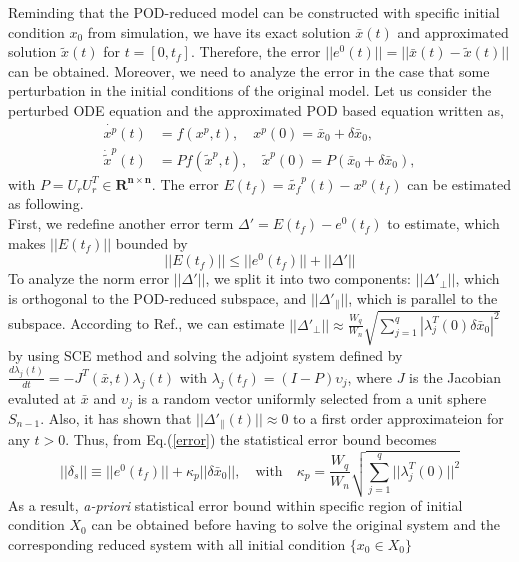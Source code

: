 \documentclass[runningheads,a4paper]{llncs}
\theoremstyle{definition}
\theoremstyle{plain}
\begin{document}
Reminding that the POD-reduced model can be constructed with specific initial condition $x_0$ from simulation, we have its exact solution $\bar{x}(t)$ and approximated solution $\tilde{x}(t)$ for $t=[0,t_f]$. Therefore, the error $||e^0(t)||=||\bar{x}(t)-\tilde{x}(t)||$ can be obtained. Moreover, we need to analyze the error in the case that some perturbation in the initial conditions of the original model. Let us consider the perturbed ODE equation and the approximated POD based equation written as,
\begin{align}
\dot{x^p}(t)&=f(x^p,t), \quad x^p(0)=\bar{x}_0 +\delta \bar{x}_0,\\
\dot{\tilde{x}}^p(t)&=P f(\tilde{x}^p,t), \quad \tilde{x}^p(0)=P (\bar{x}_0 +\delta \bar{x}_0),
\end{align}
with $P=U_r U_r^T \in \mathbf{R^{n \times n}}$. The error $E(t_f)=\tilde{x_f}^p(t)-x^p(t_f)$ can be estimated as following.\\
First, we redefine another error term $\Delta'=E(t_f)-e^0(t_f)$ to estimate, which makes $||E(t_f)||$ bounded by 
\begin{equation}
||E(t_f)||\leq ||e^0(t_f)||+||\Delta'|| \label{error}
\end{equation} 
To analyze the norm error $||\Delta'||$, we split it into two components: $||\Delta'_\perp||$, which is orthogonal to the POD-reduced subspace, and $||\Delta'_\parallel||$, which is parallel to the subspace.
According to Ref.\cite{Homescu05errorestimation}, we can estimate $||\Delta'_\perp||\approx \frac{W_q}{W_n}\sqrt{\sum_{j=1}^q |\lambda_j^T (0)\delta \bar{x}_0|^2}$ by using SCE method and solving the adjoint system defined by $\frac{d\lambda_j(t)}{dt}=-J^T(\bar{x},t)\lambda_j(t)$ with $\lambda_j(t_f)=(I-P) \upsilon_j$, where $J$ is the Jacobian evaluted at $\bar{x}$ and $\upsilon_j$ is a random vector uniformly selected from a unit sphere $S_{n-1}$. Also, it has shown that $||\Delta'_\parallel(t)||\approx 0$ to a first order approximateion for any $t>0$. Thus, from Eq.(\ref{error}) the statistical error bound becomes
\begin{equation}
||\delta_s||\equiv||e^0(t_f)||+\kappa_p ||\delta \bar{x}_0||, \quad \mbox{with}\quad \kappa_p=\frac{W_q}{W_n}\sqrt{\sum_{j=1}^q ||\lambda_j^T (0)||^2}
\end{equation}
As a result, \textit{a-priori} statistical error bound within specific region of initial condition $X_0$ can be obtained before having to solve the original system and the corresponding reduced system with all initial condition $\{x_0 \in X_0\}$  
\end{document}
